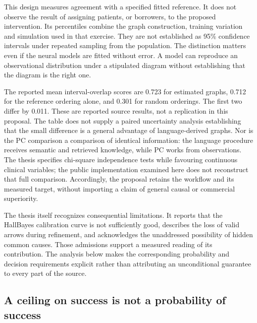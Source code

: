 This design measures agreement with a specified fitted reference. It does
not observe the result of assigning patients, or borrowers, to the proposed
intervention. Its percentiles combine the graph construction, training
variation and simulation used in that exercise. They are not established as
95\% confidence intervals under repeated sampling from the population.
The distinction matters even if the neural models are fitted without error.
A model can reproduce an observational distribution under a stipulated
diagram without establishing that the diagram is the right one.

The reported mean interval-overlap scores are 0.723 for estimated graphs,
0.712 for the reference ordering alone, and 0.301 for random orderings.
The first two differ by 0.011. These are reported source results, not a
replication in this proposal. The table does not supply a paired uncertainty
analysis establishing that the small difference is a general advantage of
language-derived graphs. Nor is the PC comparison a comparison of identical
information: the language procedure receives semantic and retrieved
knowledge, while PC works from observations. The thesis specifies
chi-square independence tests while favouring continuous clinical variables;
the public implementation examined here does not reconstruct that full
comparison. Accordingly, the proposal retains the workflow and its measured
target, without importing a claim of general causal or commercial superiority.
\citep[pp.~54--55, 77--79, Tables 10--11]{closure30molero}

The thesis itself recognizes consequential limitations. It reports that the
HallBayes calibration curve is not sufficiently good, describes the loss of
valid arrows during refinement, and acknowledges the unaddressed possibility
of hidden common causes. Those admissions support a measured reading of its
contribution. The analysis below makes the corresponding probability and
decision requirements explicit rather than attributing an unconditional
guarantee to every part of the source.
\citep[pp.~68--69 and 79]{closure30molero}

\subsection{A ceiling on success is not a probability of success}

